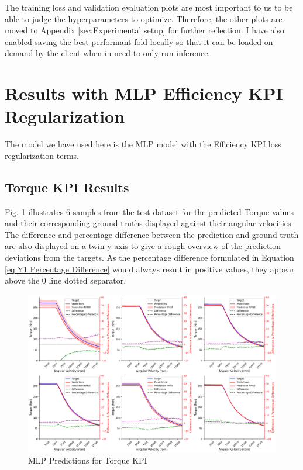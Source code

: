 \documentclass{report} %
\begin{document}
The training loss and validation evaluation plots are most important to us to be able to judge the hyperparameters to optimize. 
Therefore, the other plots are moved to Appendix \ref{sec:Experimental setup} for further reflection.
I have also enabled saving the best performant fold locally so that it can be loaded on demand by the client when in need to only run inference.

\section{Results with MLP Efficiency KPI Regularization}\label{sec:Results with MLP Efficiency KPI Regularization}
The model we have used here is the \ac{MLP} model with the Efficiency \ac{KPI} loss regularization terms.
\subsection{Torque KPI Results}\label{subsec:Torque KPI Results with MLP Efficiency KPI Regularization}

Fig. \ref{fig:MLP Training Results for 2D KPI(Torque)} illustrates 6 samples from the test dataset for the predicted Torque values and their corresponding ground truths 
displayed against their angular velocities. The difference and percentage difference between the prediction and ground truth are also displayed on a twin y axis to 
give a rough overview of the prediction deviations from the targets. As the percentage difference formulated in Equation \ref{eq:Y1 Percentage Difference} would 
always result in positive values, they appear above the 0 line dotted separator.
\begin{figure}[H]
    \centering
    \includegraphics[width=.9\textwidth]{./ReportImages/KPI2D_predictions.png} 
    \caption{MLP Predictions for Torque \ac{KPI}} 
    \label{fig:MLP Training Results for 2D KPI(Torque)}
\end{figure}
\end{document}
